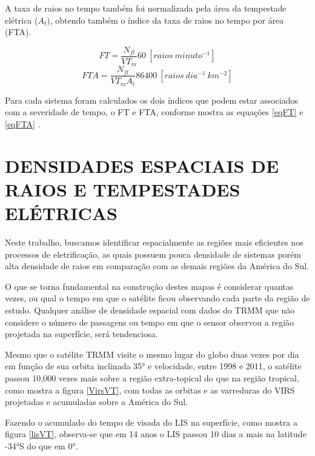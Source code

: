 
A taxa de raios no tempo também foi normalizada pela área da tempestade elétrica ($A_t$), obtendo também o índice da taxa de raios no tempo por área (FTA). 

\begin{equation}
FT = \frac{N_{fl} }{VT_m} 60 ~[raios~minuto^{-1}]  
\label{eqFT}  
\end{equation}
\begin{equation}
FTA = \frac{N_{fl} }{VT_m A_t } 86400 ~[raios~dia^{-1}~km^{-2}]
\label{eqFTA}
\end{equation}

Para cada sistema foram calculados os dois índices que podem estar associados com a severidade de tempo, o FT e FTA, conforme mostra as equações \ref{eqFT} e \ref{eqFTA} 
 .

\section{DENSIDADES ESPACIAIS DE RAIOS E TEMPESTADES ELÉTRICAS}

Neste trabalho, buscamos identificar espacialmente as regiões mais eficientes nos processos de eletrificação, as quais possuem pouca densidade de sistemas porém alta densidade de raios em comparação com as demais regiões da América do Sul.

O que se torna fundamental na construção destes mapas é considerar quantas vezes, ou qual o tempo em que o satélite ficou observando cada parte da região de estudo. Qualquer análise de densidade espacial com dados do TRMM que não considere o número de passagens ou tempo em que o sensor observou a região projetada na superfície, será tendenciosa.

Mesmo que o satélite TRMM visite o mesmo lugar do globo duas vezes por dia em função de sua orbita inclinada 35° e velocidade, entre 1998 e 2011, o satélite passou 10,000 vezes mais sobre a região extra-topical do que na região tropical, como mostra a figura \ref{VirsVT}, com todas as orbitas e as varreduras do VIRS projetadas e acumuladas sobre a América do Sul. 

Fazendo o acumulado do tempo de visada do LIS na superfície, como mostra a figura \ref{lisVT}, observa-se que em 14 anos o LIS passou 10 dias a mais na latitude -34°S do que em 0°.

